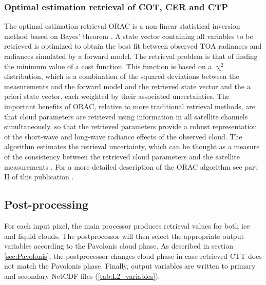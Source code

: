 \subsubsection{Optimal estimation retrieval of COT, CER and CTP}
The optimal estimation retrieval ORAC is a non-linear statistical inversion method based on Bayes' theorem \citep{Rodgers09}. A state vector containing all variables to be retrieved is optimized to obtain the best fit between observed TOA radiances and radiances simulated by a forward model. The retrieval problem is that of finding the minimum value of a cost function. This function is based on a $\upchi^2$ distribution, which is a combination of the squared deviations between the measurements and the forward model and the retrieved state vector and the a priori state vector, each weighted by their associated uncertainties. The important benefits of ORAC, relative to more traditional retrieval methods, are that cloud parameters are retrieved using information in all satellite channels simultaneously, so that the retrieved parameters provide a robust representation of the short-wave and long-wave radiance effects of the observed cloud. The algorithm estimates the retrieval uncertainty, which can be thought as a measure of the consistency between the retrieved cloud parameters and the satellite measurements \citep{Poulsen12}. For a more detailed description of the ORAC algorithm see part II of this publication \citep{GregPart2}.
\subsection{Post-processing}

For each input pixel, the main processor produces retrieval values for both ice and liquid clouds. The postprocessor will then select the appropriate output variables according to the Pavolonis cloud phase. As described in section \ref{sec:Pavolonis}, the postprocessor changes cloud phase in case retrieved CTT does not match the Pavolonis phase. Finally, output variables are written to primary and secondary NetCDF files (\cref{tab:L2_variables}).

